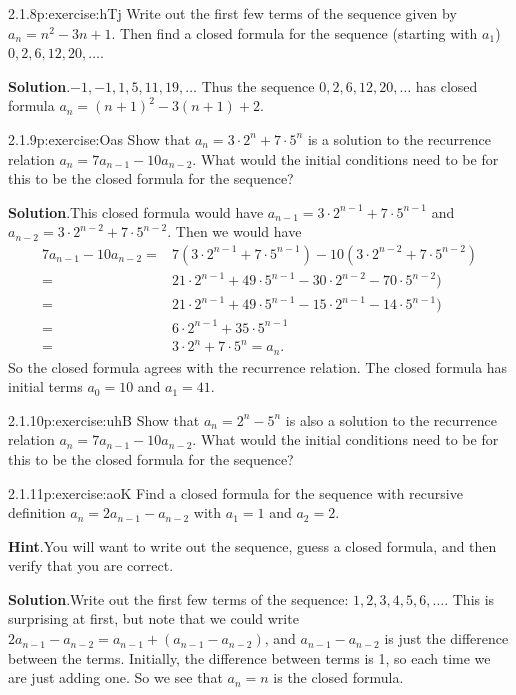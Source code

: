 \documentclass[twoside,11pt,]{book}
\newcommand{\blocktitlefont}{\relax}
\numberwithin{equation}{chapter}
\newcommand{\amp}{&}
\begin{document}
\begin{divisionsolution}{2.1.8}{}{p:exercise:hTj}%
Write out the first few terms of the sequence given by \(a_n = n^2 - 3n + 1\). Then find a closed formula for the sequence (starting with \(a_1\)) \(0, 2, 6, 12, 20, \ldots\).%
\par\smallskip%
\noindent\textbf{\blocktitlefont Solution}.\quad{}\(-1, -1, 1, 5, 11, 19,\ldots\) Thus the sequence \(0, 2, 6, 12, 20,\ldots\) has closed formula \(a_n = (n+1)^2 - 3(n+1) + 2\).%
\end{divisionsolution}%
\begin{divisionsolution}{2.1.9}{}{p:exercise:Oas}%
Show that \(a_n = 3\cdot 2^n + 7\cdot 5^n\) is a solution to the recurrence relation \(a_n = 7a_{n-1} - 10a_{n-2}\). What would the initial conditions need to be for this to be the closed formula for the sequence?%
\par\smallskip%
\noindent\textbf{\blocktitlefont Solution}.\quad{}This closed formula would have \(a_{n-1} = 3\cdot 2^{n-1} + 7 \cdot 5^{n-1}\) and \(a_{n-2} = 3\cdot 2^{n-2} + 7 \cdot 5^{n-2}\). Then we would have%
\begin{align*}
7a_{n-1} - 10a_{n-2} = \amp 7(3\cdot 2^{n-1} + 7 \cdot 5^{n-1}) - 10(3\cdot 2^{n-2} + 7 \cdot 5^{n-2})\\
= \amp 21\cdot 2^{n-1} + 49 \cdot 5^{n-1} - 30\cdot 2^{n-2} - 70 \cdot 5^{n-2})\\
= \amp 21\cdot 2^{n-1} + 49 \cdot 5^{n-1} - 15\cdot 2^{n-1} - 14 \cdot 5^{n-1})\\
= \amp 6\cdot 2^{n-1} + 35 \cdot 5^{n-1}\\
= \amp 3\cdot 2^{n} + 7 \cdot 5^{n} = a_n\text{.}
\end{align*}
So the closed formula agrees with the recurrence relation. The closed formula has initial terms \(a_0 = 10\) and \(a_1 = 41\).%
\end{divisionsolution}%
\begin{divisionsolution}{2.1.10}{}{p:exercise:uhB}%
Show that \(a_n = 2^n - 5^n\) is also a solution to the recurrence relation \(a_n = 7a_{n-1} - 10a_{n-2}\). What would the initial conditions need to be for this to be the closed formula for the sequence?%
\end{divisionsolution}%
\begin{divisionsolution}{2.1.11}{}{p:exercise:aoK}%
Find a closed formula for the sequence with recursive definition \(a_n = 2a_{n-1} - a_{n-2}\) with \(a_1 = 1\) and \(a_2 = 2\).%
\par\smallskip%
\noindent\textbf{\blocktitlefont Hint}.\quad{}You will want to write out the sequence, guess a closed formula, and then verify that you are correct.%
\par\smallskip%
\noindent\textbf{\blocktitlefont Solution}.\quad{}Write out the first few terms of the sequence: \(1, 2, 3, 4, 5, 6,\ldots\). This is surprising at first, but note that we could write \(2a_{n-1} - a_{n-2} = a_{n-1} + (a_{n-1} -a_{n-2})\), and \(a_{n-1} - a_{n-2}\) is just the difference between the terms. Initially, the difference between terms is 1, so each time we are just adding one. So we see that \(a_n = n\) is the closed formula.%
\end{divisionsolution}%
\end{document}
